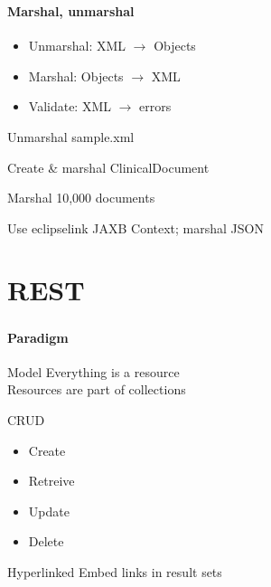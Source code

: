 \documentclass[handout]{beamer}
\begin{document}
\begin{frame}
	\frametitle{\insertsection}
	\framesubtitle{Marshal, unmarshal}
	\begin{definition}
		\begin{itemize}
			\item Unmarshal: XML $\rightarrow$ Objects
			\item Marshal: Objects $\rightarrow$ XML
			\item Validate: XML $\rightarrow$ errors
		\end{itemize}
	\end{definition}
	\begin{semiverbatim}
		Unmarshal sample.xml
	\end{semiverbatim}
	\begin{semiverbatim}
		Create \& marshal ClinicalDocument
	\end{semiverbatim}
	\begin{semiverbatim}
		Marshal 10,000 documents
	\end{semiverbatim}
	\begin{semiverbatim}
		Use eclipselink JAXB Context; marshal JSON
	\end{semiverbatim}
\end{frame}

\section{REST}
\begin{frame}
	\frametitle{\insertsection}
	\framesubtitle{Paradigm}
	\begin{block}{Model}
		Everything is a resource \\
		Resources are part of collections
	\end{block}
	\begin{block}{CRUD}
		\begin{itemize}
			\item Create
			\item Retreive
			\item Update
			\item Delete
		\end{itemize}
	\end{block}
	\begin{block}{Hyperlinked}
		Embed links in result sets
	\end{block}
\end{frame}
\end{document}
